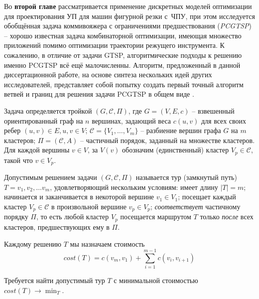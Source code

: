 
Во {\bf второй главе}
рассматривается
применение дискретных моделей оптимизации
для проектирования УП для машин
фигурной резки с~ЧПУ,
при этом исследуется
обобщённая задача коммивояжера с
ограничениями предшествования ({\it PCGTSP}) --
хорошо известная задача комбинаторной оптимизации,
имеющая множество приложений помимо
оптимизации траектории режущего инструмента.
К сожалению,
в отличие от задачи GTSP,
алгоритмические подходы к решению
именно PCGTSP всё ещё малочисленны.
Алгоритм, предложенный в данной диссертационной работе,
на основе синтеза нескольких идей других исследователей,
представляет собой попытку
создать первый точный алгоритм
ветвей и границ для
решения задачи PCGTSP в общем виде
\cite{bi:pcgtsp2021}.

Задача определяется тройкой
$(G,\mathcal C,\Pi)$,
где
$G=(V,E,c)$ -- взвешенный ориентированный граф на $n$
вершинах,
задающий веса $c(u,v)$ для всех своих ребер
$(u,v)\in E, u, v \in V$;
$\mathcal C=\{V_1,\ldots,V_m\}$ -- разбиение вершин
графа $G$ на $m$ кластеров;
$ \Pi = (\mathcal C, A) $ -- частичный порядок,
заданный на множестве кластеров.
Для каждой вершины
$v\in V$, за $V(v)$
обозначим (единственный) кластер
$V_p\in\mathcal C$,
такой что
$v\in V_p$.

Допустимым решением задачи
$(G,\mathcal C,\Pi)$
называется тур (замкнутый путь) $T = v_1, v_2, \dots v_m$,
удовлетворяющий нескольким условиям:
  имеет длину $|T|=m$;
  начинается и заканчивается в некоторой вершине $v_1\in V_1$;
  посещает каждый кластер $V_p\in\mathcal C$ в произвольной вершине $v_p \in V_p$;
  \textit{соответствует} частичному порядку $\Pi$,
  то есть любой кластер $V_p$
  посещается маршрутом $T$
  только \textit{после}
  всех кластеров, предшествующих ему в
  $\Pi$.

Каждому решению
$T$
мы назначаем стоимость
\begin{equation}
    \label{eq:pctgsp-cost}
	cost(T) = c(v_m,v_1) + \sum_{i=1}^{m-1} c(v_i,v_{i+1})
\end{equation}

Требуется найти допустимый тур
$ T $
с минимальной стоимостью
$
cost (T) \to \min_T
$.

